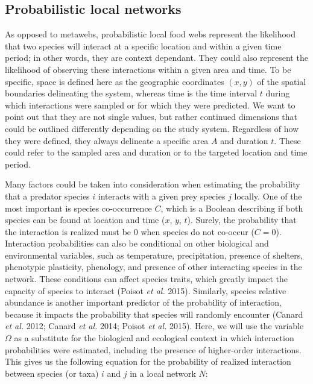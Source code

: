 \documentclass[10pt,oneside]{article}
\begin{document}
\hypertarget{probabilistic-local-networks}{%
\subsection{Probabilistic local
networks}\label{probabilistic-local-networks}}

As opposed to metawebs, probabilistic local food webs represent the
likelihood that two species will interact at a specific location and
within a given time period; in other words, they are context dependant.
They could also represent the likelihood of observing these interactions
within a given area and time. To be specific, space is defined here as
the geographic coordinates \((x, y)\) of the spatial boundaries
delineating the system, whereas time is the time interval \(t\) during
which interactions were sampled or for which they were predicted. We
want to point out that they are not single values, but rather continued
dimensions that could be outlined differently depending on the study
system. Regardless of how they were defined, they always delineate a
specific area \(A\) and duration \(t\). These could refer to the sampled
area and duration or to the targeted location and time period.

Many factors could be taken into consideration when estimating the
probability that a predator species \(i\) interacts with a given prey
species \(j\) locally. One of the most important is species
co-occurrence \(C\), which is a Boolean describing if both species can
be found at location and time (\(x\), \(y\), \(t\)). Surely, the
probability that the interaction is realized must be \(0\) when species
do not co-occur (\(C = 0\)). Interaction probabilities can also be
conditional on other biological and environmental variables, such as
temperature, precipitation, presence of shelters, phenotypic plasticity,
phenology, and presence of other interacting species in the network.
These conditions can affect species traits, which greatly impact the
capacity of species to interact (Poisot \emph{et al.} 2015). Similarly,
species relative abundance is another important predictor of the
probability of interaction, because it impacts the probability that
species will randomly encounter (Canard \emph{et al.} 2012; Canard
\emph{et al.} 2014; Poisot \emph{et al.} 2015). Here, we will use the
variable \(\Omega\) as a substitute for the biological and ecological
context in which interaction probabilities were estimated, including the
presence of higher-order interactions. This gives us the following
equation for the probability of realized interaction between species (or
taxa) \(i\) and \(j\) in a local network \(N\):
\end{document}
